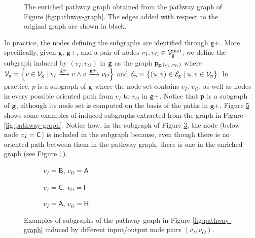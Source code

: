 \begin{figure}[h!]
    \centering
    \resizebox{.6\textwidth}{!}{}
    \caption{The enriched pathway graph obtained from the pathway graph of Figure \ref{fig:pathway-graph}. The edges added with respect to the original graph are shown in black.}
    \label{fig:pathway-graph-enriched}
\end{figure}
In practice, the nodes defining the subgraphs are identified through $\mathtt{g+}$. More specifically, given $\mathtt{g}$, $\mathtt{g+}$, and a pair of nodes $v_I, v_O \in \Nodes_{\Graph{g}}^{\Fun{mol}}$, we define the subgraph induced by $(v_I,v_O)$ in $\mathtt{g}$ as the graph $\mathtt{p}_{\mathtt{g},(v_I,v_O)}$ where $\Nodes_{\Graph{p}} = \Set{v \in \Nodes_{\Graph{g}} \mid \Path{v_I}{\Graph{g+}}{v} \wedge \Path{v}{\Graph{g+}}{v_O}}$ and $\Edges_{\Graph{p}} = \Set{(u,v) \in \Edges_{\Graph{g}} \mid u,v \in \Nodes_{\Graph{p}}}$. In practice, $p$ is a subgraph of $\mathtt{g}$ where the node set contains $v_I$, $v_O$, as well as nodes in every possible oriented path from $v_I$ to $v_O$ in $\mathtt{g+}$. Notice that $\mathtt{p}$ is a subgraph of $\mathtt{g}$, although its node set is computed on the basis of the paths in $\mathtt{g+}$. Figure \ref{fig:subgraphs} shows some examples of induced subgraphs extracted from the graph in Figure \ref{fig:pathway-graph}. Notice how, in the subgraph of Figure \ref{subfig:subgraph2}, the node  (below node $v_I = \mathsf{C}$) is included in the subgraph because, even though there is no oriented path between them in the pathway graph, there is one in the enriched graph (see Figure \ref{fig:pathway-graph-enriched}).
\begin{figure}[h!]
    \begin{subfigure}[b]{0.22\linewidth}
        \centering
        \resizebox{.9\textwidth}{!}{}
        \caption{$v_I=\mathsf{B},\, v_O=\mathsf{A}$}\label{subfig:subgraph1}
    \end{subfigure}
    \begin{subfigure}[b]{0.33\linewidth}
        \centering
        \resizebox{.9\textwidth}{!}{}
        \caption{$v_I=\mathsf{C},\, v_O=\mathsf{F}$}\label{subfig:subgraph2}
    \end{subfigure}
    \begin{subfigure}[b]{0.44\linewidth}
        \centering
        \resizebox{1.\textwidth}{!}{}
        \caption{$v_I=\mathsf{A},\, v_O=\mathsf{H}$}\label{subfig:subgraph3}
    \end{subfigure}
    \caption{Examples of subgraphs of the pathway graph in Figure \ref{fig:pathway-graph} induced by different input/output node pairs $(v_I,v_O)$.}\label{fig:subgraphs}
\end{figure}

